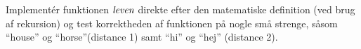 Implement\'{e}r funktionen $\emph{leven}$ direkte efter den matematiske definition (ved brug af rekursion) og test korrektheden af funktionen på nogle små strenge, såsom ``house'' og ``horse''(distance 1) samt ``hi'' og ``hej'' (distance 2).